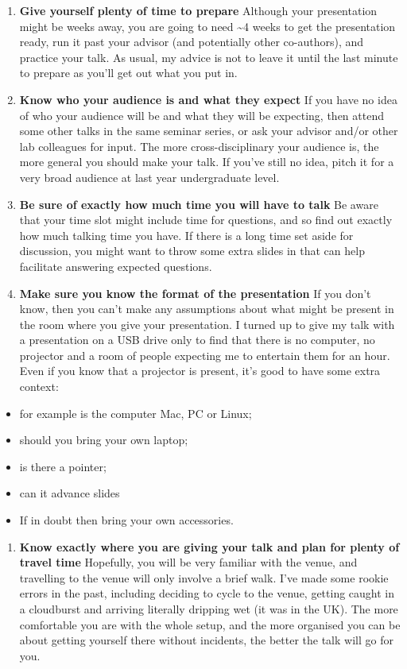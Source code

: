 \documentclass[
]{krantz}
\providecommand{\tightlist}{%
  \setlength{\itemsep}{0pt}\setlength{\parskip}{0pt}}
\begin{document}
\begin{enumerate}
\def\labelenumi{\arabic{enumi}.}
\tightlist
\item
  \textbf{Give yourself plenty of time to prepare}
  Although your presentation might be weeks away, you are going to need \textasciitilde4 weeks to get the presentation ready, run it past your advisor (and potentially other co-authors), and practice your talk. As usual, my advice is not to leave it until the last minute to prepare as you'll get out what you put in.
\item
  \textbf{Know who your audience is and what they expect}
  If you have no idea of who your audience will be and what they will be expecting, then attend some other talks in the same seminar series, or ask your advisor and/or other lab colleagues for input. The more cross-disciplinary your audience is, the more general you should make your talk. If you've still no idea, pitch it for a very broad audience at last year undergraduate level.
\item
  \textbf{Be sure of exactly how much time you will have to talk}
  Be aware that your time slot might include time for questions, and so find out exactly how much talking time you have. If there is a long time set aside for discussion, you might want to throw some extra slides in that can help facilitate answering expected questions.
\item
  \textbf{Make sure you know the format of the presentation}
  If you don't know, then you can't make any assumptions about what might be present in the room where you give your presentation. I turned up to give my talk with a presentation on a USB drive only to find that there is no computer, no projector and a room of people expecting me to entertain them for an hour. Even if you know that a projector is present, it's good to have some extra context:
\end{enumerate}

\begin{itemize}
\tightlist
\item
  for example is the computer Mac, PC or Linux;
\item
  should you bring your own laptop;
\item
  is there a pointer;
\item
  can it advance slides
\item
  If in doubt then bring your own accessories.
\end{itemize}

\begin{enumerate}
\def\labelenumi{\arabic{enumi}.}
\setcounter{enumi}{4}
\tightlist
\item
  \textbf{Know exactly where you are giving your talk and plan for plenty of travel time}
  Hopefully, you will be very familiar with the venue, and travelling to the venue will only involve a brief walk. I've made some rookie errors in the past, including deciding to cycle to the venue, getting caught in a cloudburst and arriving literally dripping wet (it was in the UK). The more comfortable you are with the whole setup, and the more organised you can be about getting yourself there without incidents, the better the talk will go for you.
\end{enumerate}
\end{document}

